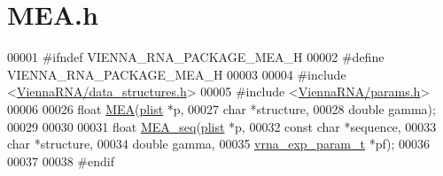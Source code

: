 \hypertarget{_m_e_a_8h_source}{}\section{M\+E\+A.\+h}
\label{_m_e_a_8h_source}

\begin{DoxyCode}
00001 \textcolor{preprocessor}{#ifndef VIENNA\_RNA\_PACKAGE\_MEA\_H}
00002 \textcolor{preprocessor}{#define VIENNA\_RNA\_PACKAGE\_MEA\_H}
00003 
00004 \textcolor{preprocessor}{#include <\mbox{\hyperlink{data__structures_8h}{ViennaRNA/data\_structures.h}}>}
00005 \textcolor{preprocessor}{#include <\mbox{\hyperlink{params_8h}{ViennaRNA/params.h}}>}
00006 
00026 \textcolor{keywordtype}{float} \mbox{\hyperlink{group__mea__fold_ga396ec6144c6a74fcbab4cea6b42d76c3}{MEA}}(\mbox{\hyperlink{group__struct__utils_structvrna__elem__prob__s}{plist}}   *p,
00027           \textcolor{keywordtype}{char}    *structure,
00028           \textcolor{keywordtype}{double}  gamma);
00029 
00030 
00031 \textcolor{keywordtype}{float} \mbox{\hyperlink{_m_e_a_8h_a2cf5bfe54279d19139da8e81819fefd7}{MEA\_seq}}(\mbox{\hyperlink{group__struct__utils_structvrna__elem__prob__s}{plist}}             *p,
00032               \textcolor{keyword}{const} \textcolor{keywordtype}{char}        *sequence,
00033               \textcolor{keywordtype}{char}              *structure,
00034               \textcolor{keywordtype}{double}            gamma,
00035               \mbox{\hyperlink{group__energy__parameters_structvrna__exp__param__s}{vrna\_exp\_param\_t}}  *pf);
00036 
00037 
00038 \textcolor{preprocessor}{#endif}
\end{DoxyCode}

